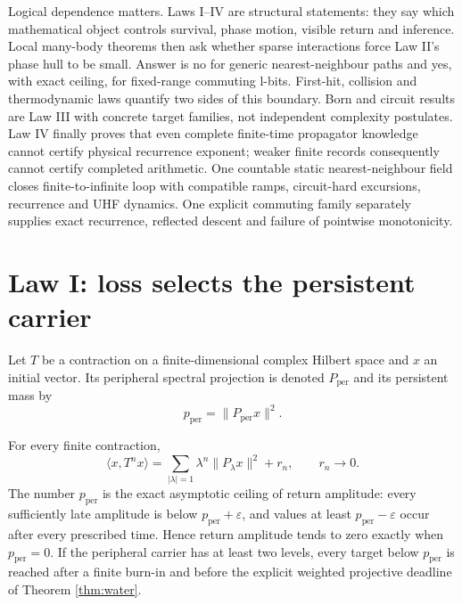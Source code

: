Logical dependence matters.  Laws I--IV are structural statements: they say
which mathematical object controls survival, phase motion, visible return and
inference.  Local many-body theorems then ask whether sparse interactions
force Law II's phase hull to be small.  Answer is no for generic
nearest-neighbour paths and yes, with exact ceiling, for fixed-range
commuting l-bits.  First-hit, collision and thermodynamic laws quantify two
sides of this boundary.  Born and circuit results are Law III with concrete
target families, not independent complexity postulates.  Law IV finally
proves that even complete finite-time propagator knowledge cannot certify
physical recurrence exponent; weaker finite records consequently cannot
certify completed arithmetic.  One
countable static nearest-neighbour field closes finite-to-infinite loop with
compatible ramps, circuit-hard excursions, recurrence and UHF dynamics.  One
explicit commuting family separately supplies exact recurrence, reflected
descent and failure of pointwise monotonicity.

\section{Law I: loss selects the persistent carrier}

Let $T$ be a contraction on a finite-dimensional complex Hilbert space and
$x$ an initial vector.  Its peripheral spectral projection is denoted
$P_{\mathrm{per}}$ and its persistent mass by
\begin{equation}
 p_{\mathrm{per}}=\|P_{\mathrm{per}}x\|^2.            \label{eq:peripheral-new}
\end{equation}

\begin{theorem}
\label{thm:carrier}
For every finite contraction,
\begin{equation}
 \langle x,T^nx\rangle
 =\sum_{|\lambda|=1}\lambda^n\|P_\lambda x\|^2+r_n,
 \qquad r_n\longrightarrow0.                         \label{eq:persistentdecomp-new}
\end{equation}
The number $p_{\mathrm{per}}$ is the exact asymptotic ceiling of return
amplitude: every sufficiently late amplitude is below
$p_{\mathrm{per}}+\varepsilon$, and values at least
$p_{\mathrm{per}}-\varepsilon$ occur after every prescribed time.  Hence
return amplitude tends to zero exactly when $p_{\mathrm{per}}=0$.  If the
peripheral carrier has at least two levels, every target below
$p_{\mathrm{per}}$ is reached after a finite burn-in and before the explicit
weighted projective deadline of Theorem \ref{thm:water}.
\end{theorem}

